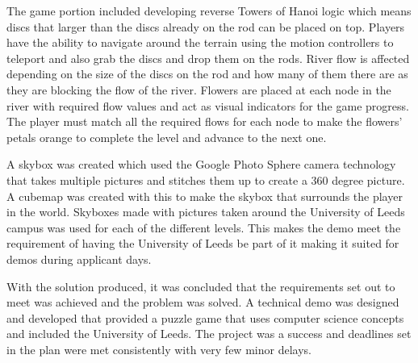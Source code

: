 \newline
\par
The game portion included developing reverse Towers of Hanoi logic which means discs that larger than the discs already on the rod can be placed on top. Players have the ability to navigate around the terrain using the motion controllers to teleport and also grab the discs and drop them on the rods. River flow is affected depending on the size of the discs on the rod and how many of them there are as they are blocking the flow of the river. Flowers are placed at each node in the river with required flow values and act as visual indicators for the game progress. The player must match all the required flows for each node to make the flowers' petals orange to complete the level and advance to the next one.
\newline
\par
A skybox was created which used the Google Photo Sphere camera technology that takes multiple pictures and stitches them up to create a 360 degree picture. A cubemap was created with this to make the skybox that surrounds the player in the world. Skyboxes made with pictures taken around the University of Leeds campus was used for each of the different levels. This makes the demo meet the requirement of having the University of Leeds be part of it making it suited for demos during applicant days.
\newline
\par
With the solution produced, it was concluded that the requirements set out to meet was achieved and the problem was solved. A technical demo was designed and developed that provided a puzzle game that uses computer science concepts and included the University of Leeds. The project was a success and deadlines set in the plan were met consistently with very few minor delays.

